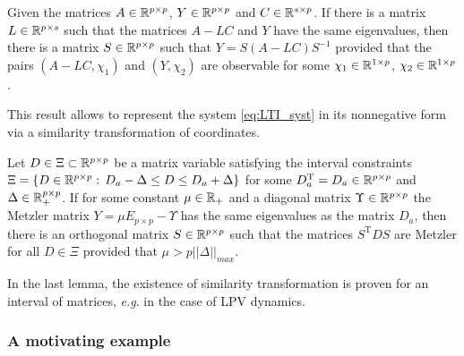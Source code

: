 \begin{lemma}
	\label{lem:l2}
	\begin{leftbar}[lemmabar]
		Given the matrices $A\in\mathbb{R}^{p\times p}$, $Y\in\mathbb{R}^{p\times p}$ and \textup{$C\in\mathbb{R}^{s\times p}$. }If there is a matrix \textup{$L\in\mathbb{R}^{p\times s}$} such that the matrices $A-LC$ and $Y$ have the same eigenvalues, then there is a matrix $S\in\mathbb{R}^{p\times p}$ such that $Y=S(A-LC)S^{-1}$ provided that the pairs $(A-LC,\chi_{1})$ and $(Y,\chi_{2})$ are observable for some $\chi_{1}\in\mathbb{R}^{1\times p}$, $\chi_{2}\in\mathbb{R}^{1\times p}$.
	\end{leftbar}
\end{lemma}
This result allows to represent the system \eqref{eq:LTI_syst} in its nonnegative form via a similarity transformation of coordinates.
\begin{lemma}
	\label{lem:l3}
	\begin{leftbar}[lemmabar]
		Let $D\in\Xi\subset\mathbb{R}^{p\times p}$ be a matrix variable satisfying the interval constraints $\Xi=\{D\in\mathbb{R}^{p\times p}:\,D_{a}-\Delta\le D\le D_{a}+\Delta\}$ for some $D_{a}^{\text{T}}=D_{a}\in\mathbb{R}^{p\times p}$ and $\Delta\in\mathbb{R}_{+}^{p\times p}$. If for some constant $\mu\in\mathbb{R}_{+}$ and a diagonal matrix $\Upsilon\in\mathbb{R}^{p\times p}$ the Metzler matrix $Y=\mu E_{p\times p}-\Upsilon$ has the same eigenvalues as the matrix $D_{a}$, then there is an orthogonal matrix $S\in\mathbb{R}^{p\times p}$ such that the matrices $S^{\text{T}}DS$ are Metzler for all $D\in\Xi$ provided that $\mu>p||\Delta||_{max}$.\textup{ }
	\end{leftbar}
\end{lemma}
In the last lemma, the existence of similarity transformation is proven for an interval of matrices, \emph{e.g}. in the case of \gls{LPV} dynamics.


\subsubsection{A motivating example}

